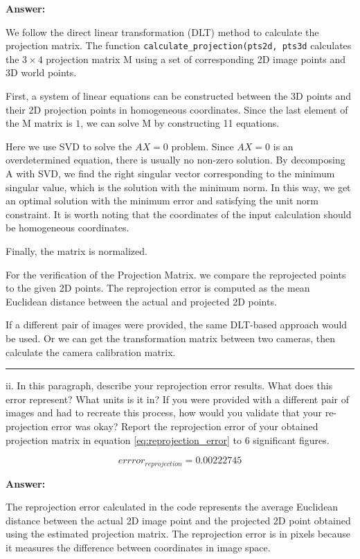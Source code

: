 \documentclass[onecolumn,10pt]{article}
\begin{document}
\textbf{Answer:}

We follow the direct linear transformation (DLT) method to calculate the projection matrix.
The function {\tt  calculate\_projection(pts2d, pts3d} calculates the $3×4$ projection matrix M using a set of corresponding 2D image points and 3D world points.

First, a system of linear equations can be constructed between the 3D points and their 2D projection points in homogeneous coordinates. Since the last element of the M matrix is $1$, we can solve M by constructing 11 equations.

Here we use SVD to solve the $AX = 0$ problem. Since $AX=0$ is an overdetermined equation, there is usually no non-zero solution. By decomposing A with SVD, we find the right singular vector corresponding to the minimum singular value, which is the solution with the minimum norm. In this way, we get an optimal solution with the minimum error and satisfying the unit norm constraint. It is worth noting that the coordinates of the input calculation should be homogeneous coordinates.

Finally, the matrix is normalized.

For the verification of the Projection Matrix. we compare the reprojected points to the given 2D points. The reprojection error is computed as the mean Euclidean distance between the actual and projected 2D points.

If a different pair of images were provided, the same DLT-based approach would be used. Or we can get the transformation matrix between two cameras, then calculate the camera calibration matrix.

\hrule

ii. In this paragraph, describe your reprojection error results. What does this error represent? What units is it in? If you were provided with a different pair of images and had to recreate this process, how would you validate that your re-projection error was okay? Report the reprojection error of your obtained projection matrix in equation \eqref{eq:reprojection_error} to 6 significant figures.


\begin{equation}
errror_{reprojection}=0.00222745 \label{eq:reprojection_error}
\end{equation}

\textbf{Answer:}

The reprojection error calculated in the code represents the average Euclidean distance between the actual 2D image point and the projected 2D point obtained using the estimated projection matrix. The reprojection error is in pixels because it measures the difference between coordinates in image space.
\end{document}
